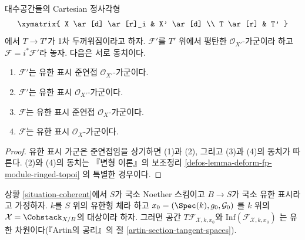 \begin{lemma}
\label{lemma-coherent-over-first-order-thickening}
대수공간들의 Cartesian 정사각형
$$
\xymatrix{
X \ar[d] \ar[r]_i & X' \ar[d] \\
T \ar[r] & T'
}
$$
에서 $T \to T'$가 1차 두꺼워짐이라고 하자.
$\mathcal{F}'$를 $T'$ 위에서 평탄한 $\mathcal{O}_{X'}$-가군이라
하고 $\mathcal{F} = i^*\mathcal{F}'$라 놓자. 다음은 서로 동치이다.
\begin{enumerate}
\item $\mathcal{F}'$는 유한 표시 준연접 $\mathcal{O}_{X'}$-가군이다.
\item $\mathcal{F}'$는 유한 표시 $\mathcal{O}_{X'}$-가군이다.
\item $\mathcal{F}$는 유한 표시 준연접 $\mathcal{O}_X$-가군이다.
\item $\mathcal{F}$는 유한 표시 $\mathcal{O}_X$-가군이다.
\end{enumerate}
\end{lemma}

\begin{proof}
유한 표시 가군은 준연접임을 상기하면 (1)과 (2), 그리고 (3)과 (4)의
동치가 따른다. (2)와 (4)의 동치는 『변형 이론』의 보조정리
\ref{defos-lemma-deform-fp-module-ringed-topoi}
의 특별한 경우이다.
\end{proof}

\begin{lemma}
\label{lemma-coherent-tangent-space}
상황 \ref{situation-coherent}에서 $S$가 국소 Noether 스킴이고
$B \to S$가 국소 유한 표시라고 가정하자.
$k$를 $S$ 위의 유한형 체라 하고
$x_0 = (\Spec(k), g_0, \mathcal{G}_0)$
를 $k$ 위의 $\mathcal{X} = \Cohstack_{X/B}$의 대상이라 하자.
그러면 공간 $T\mathcal{F}_{\mathcal{X}, k, x_0}$와
$\text{Inf}(\mathcal{F}_{\mathcal{X}, k, x_0})$
는 유한 차원이다(『Artin의 공리』의 절
\ref{artin-section-tangent-spaces}).
\end{lemma}

